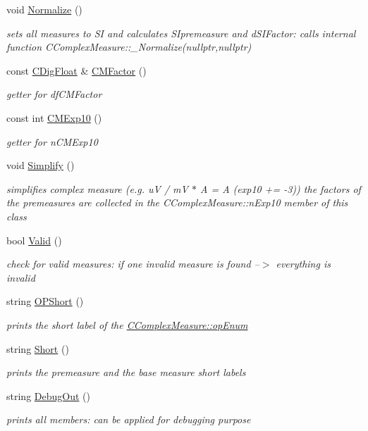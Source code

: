 \begin{DoxyCompactItemize}
void \hyperlink{classCComplexMeasure_a87cc1f3c3f0dafd7cbe00634124c8d46}{Normalize} ()
\begin{DoxyCompactList}\small\item\em sets all measures to SI and calculates S\+Ipremeasure and d\+S\+I\+Factor\+: calls internal function C\+Complex\+Measure\+::\+\_\+\+Normalize(nullptr,nullptr) \end{DoxyCompactList}\item 
const \hyperlink{classCDigFloat}{C\+Dig\+Float} \& \hyperlink{classCComplexMeasure_acdcab22efa233ea1c0e607bf22028afd}{C\+M\+Factor} ()
\begin{DoxyCompactList}\small\item\em getter for df\+C\+M\+Factor \end{DoxyCompactList}\item 
const int \hyperlink{classCComplexMeasure_a06355541d6d9b843b9d68156a0297f51}{C\+M\+Exp10} ()
\begin{DoxyCompactList}\small\item\em getter for n\+C\+M\+Exp10 \end{DoxyCompactList}\item 
void \hyperlink{classCComplexMeasure_addb4e69033f2c32fb3bf4a3aef5e1470}{Simplify} ()
\begin{DoxyCompactList}\small\item\em simplifies complex measure (e.\+g. uV / mV $\ast$ A = A (exp10 += -\/3)) the factors of the premeasures are collected in the C\+Complex\+Measure\+::n\+Exp10 member of this class \end{DoxyCompactList}\item 
bool \hyperlink{classCComplexMeasure_a1b777eef864d0c7a959dbeee321e881d}{Valid} ()
\begin{DoxyCompactList}\small\item\em check for valid measures\+: if one invalid measure is found --$>$ everything is invalid \end{DoxyCompactList}\item 
string \hyperlink{classCComplexMeasure_ab6a38e7259d7c27e735ff12fd711c5d5}{O\+P\+Short} ()
\begin{DoxyCompactList}\small\item\em prints the short label of the \hyperlink{classCComplexMeasure_ae22369976a7e5570add11a4172dcf062}{C\+Complex\+Measure\+::op\+Enum} \end{DoxyCompactList}\item 
string \hyperlink{classCComplexMeasure_a771c7c8e73b3c67803ee2c77d8a40187}{Short} ()
\begin{DoxyCompactList}\small\item\em prints the premeasure and the base measure short labels \end{DoxyCompactList}\item 
string \hyperlink{classCComplexMeasure_a83c00029eaad1c0c59fd1210108981dc}{Debug\+Out} ()
\begin{DoxyCompactList}\small\item\em prints all members\+: can be applied for debugging purpose \end{DoxyCompactList}\end{DoxyCompactItemize}
